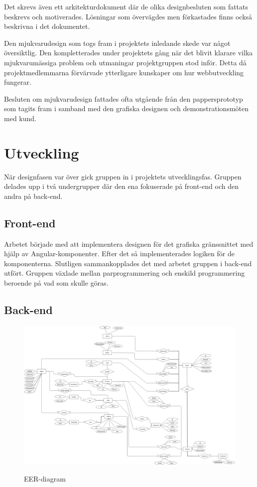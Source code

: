 Det skrevs även ett arkitekturdokument där de olika designbesluten som fattats beskrevs och motiverades. Lösningar som övervägdes men förkastades finns också beskrivna i det dokumentet.

Den mjukvarudesign som togs fram i projektets inledande skede var något översiktlig. Den kompletterades under projektets gång när det blivit klarare vilka mjukvarumässiga problem och utmaningar projektgruppen stod inför. Detta då projektmedlemmarna förvärvade ytterligare kunskaper om hur webbutveckling fungerar. 

Besluten om mjukvarudesign fattades ofta utgående från den pappersprototyp som tagits fram i samband med den grafiska designen och demonstrationsmöten med kund.

\section{Utveckling}
När designfasen var över gick gruppen in i projektets utvecklingsfas. Gruppen delades upp i två undergrupper där den ena fokuserade på front-end och den andra på back-end.

\subsection{Front-end}
Arbetet började med att implementera designen för det grafiska gränssnittet med hjälp av Angular-komponenter. Efter det så implementerades logiken för de komponenterna. Slutligen sammankopplades det med arbetet gruppen i back-end utfört. Gruppen växlade mellan parprogrammering och enskild programmering beroende på vad som skulle göras.       

\subsection{Back-end}

\begin{figure}[H]
    \includegraphics[width=\textwidth,height=.5\textheight]{Figures/EERdiagram.png}\\
    \caption{EER-diagram}
    \label{fig:EER-diagram}
\end{figure}

